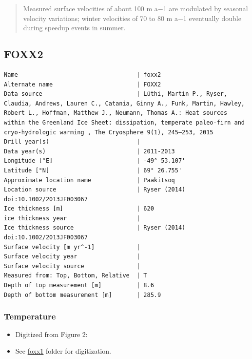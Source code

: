 \documentclass[article,a4paper,times,11pt,twoside]{article}
\begin{document}
\begin{quote}
Measured surface velocities of about 100 m a−1 are
modulated by seasonal velocity variations; winter
velocities of 70 to 80 m a−1 eventually double during
speedup events in summer. 
\end{quote}
\clearpage
\subsection{FOXX2}
\label{sec:org424aec0}
\begin{verbatim}
Name                                  | foxx2
Alternate name                        | FOXX2
Data source                           | Lüthi, Martin P., Ryser, Claudia, Andrews, Lauren C., Catania, Ginny A., Funk, Martin, Hawley, Robert L., Hoffman, Matthew J., Neumann, Thomas A.: Heat sources within the Greenland Ice Sheet: dissipation, temperate paleo-firn and cryo-hydrologic warming , The Cryosphere 9(1), 245–253, 2015 
Drill year(s)                         | 
Data year(s)                          | 2011-2013
Longitude [°E]                        | -49° 53.107'
Latitude [°N]                         | 69° 26.755'
Approximate location name             | Paakitsoq
Location source                       | Ryser (2014) doi:10.1002/2013JF003067
Ice thickness [m]                     | 620
ice thickness year                    | 
Ice thickness source                  | Ryser (2014) doi:10.1002/2013JF003067 
Surface velocity [m yr^-1]            | 
Surface velocity year                 | 
Surface velocity source               | 
Measured from: Top, Bottom, Relative  | T
Depth of top measurement [m]          | 8.6
Depth of bottom measurement [m]       | 285.9
\end{verbatim}

\subsubsection{Temperature}
\label{sec:orgf53e7c5}

\begin{itemize}
\item Digitized from \textcite{luthi_2015} Figure 2:
\item See \url{foxx1} folder for digitization.
\end{itemize}
\end{document}
